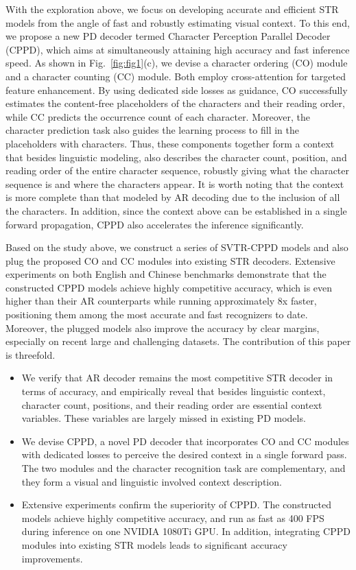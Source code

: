 \documentclass[10pt,journal,compsoc]{IEEEtran}
\begin{document}
With the exploration above, we focus on developing accurate and efficient STR models from the angle of fast and robustly estimating visual context. To this end, we propose a new PD decoder termed Character Perception Parallel Decoder (CPPD), which aims at simultaneously attaining high accuracy and fast inference speed. As shown in Fig.~\ref{fig:fig1}(c), we devise a character ordering (CO) module and a character counting (CC) module. Both employ cross-attention for targeted feature enhancement. By using dedicated side losses as guidance, CO successfully estimates the content-free placeholders of the characters and their reading order, while CC predicts the occurrence count of each character. Moreover, the character prediction task also guides the learning process to fill in the placeholders with characters. Thus, these components together form a context that besides linguistic modeling, also describes the character count, position, and reading order of the entire character sequence, robustly giving what the character sequence is and where the characters appear. It is worth noting that the context is more complete than that modeled by AR decoding due to the inclusion of all the characters. In addition, since the context above can be established in a single forward propagation, CPPD also accelerates the inference significantly.


Based on the study above, we construct a series of SVTR-CPPD models and also plug the proposed CO and CC modules into existing STR decoders. Extensive experiments on both English and Chinese benchmarks demonstrate that the constructed CPPD models achieve highly competitive accuracy, which is even higher than their AR counterparts while running approximately 8x faster, positioning them among the most accurate and fast recognizers to date. Moreover, the plugged models also improve the accuracy by clear margins, especially on recent large and challenging datasets. The contribution of this paper is threefold. 

\begin{itemize}
    \item We verify that AR decoder remains the most competitive STR decoder in terms of accuracy, and empirically reveal that besides linguistic context, character count, positions, and their reading order are essential context variables. These variables are largely missed in existing PD models.
    \item We devise CPPD, a novel PD decoder that incorporates CO and CC modules with dedicated losses to perceive the desired context in a single forward pass. The two modules and the character recognition task are complementary, and they form a visual and linguistic involved context description.  
    \item Extensive experiments confirm the superiority of CPPD. The constructed models achieve highly competitive accuracy, and run as fast as 400 FPS during inference on one NVIDIA 1080Ti GPU. In addition, integrating CPPD modules into existing STR models leads to significant accuracy improvements.
\end{itemize}
\end{document}
